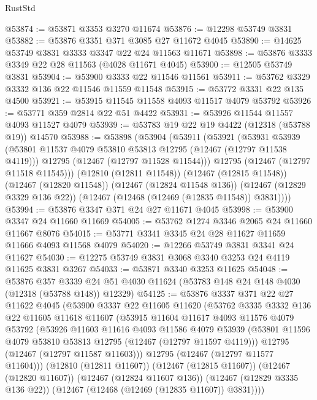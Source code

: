 \begin{lexlean}{RustStd}
\begin{coremodule}
@53874 := @53871 @3353 @3270 @11674
@53876 := @12298 @53749 @3831
@53882 := @53876 @3351 @371 @3085 @27 @11672 @4045
@53890 := @14625 @53749 @3831 @3333 @3347 @22 @24 @11563 @11671
@53898 := @53876 @3333 @3349 @22 @28 @11563 (@4028 @11671 @4045)
@53900 := @12505 @53749 @3831
@53904 := @53900 @3333 @22 @11546 @11561
@53911 := @53762 @3329 @3332 @136 @22 @11546 @11559 @11548
@53915 := @53772 @3331 @22 @135 @4500
@53921 := @53915 @11545 @11558 @4093 @11517 @4079 @53792
@53926 := @53771 @359 @2814 @22 @51 @4422
@53931 := @53926 @11544 @11557 @4093 @11527 @4079
@53939 := @53783 @19 @22 @19 @4422 (@12318 (@53788 @19)) @14570
@53988 := @53898
    (@53904
      (@53911
        (@53921
          (@53931
            @53939
            (@53801 @11537 @4079 @53810 @53813 @12795 (@12467 (@12797 @11538 @4119)))
            @12795
            (@12467 (@12797 @11528 @11544)))
          @12795
          (@12467 (@12797 @11518 @11545)))
        (@12810 (@12811 @11548))
        (@12467 (@12815 @11548))
        (@12467 (@12820 @11548))
        (@12467 (@12824 @11548 @136))
        (@12467 (@12829 @3329 @136 @22))
        (@12467 (@12468 (@12469 (@12835 @11548)) @3831))))
@53994 := @53876 @3347 @371 @24 @27 @11671 @4045
@53998 := @53900 @3347 @24 @11660 @11669
@54005 := @53762 @1274 @3346 @2065 @24 @11660 @11667 @8076
@54015 := @53771 @3341 @3345 @24 @28 @11627 @11659 @11666 @4093 @11568 @4079
@54020 := @12266 @53749 @3831 @3341 @24 @11627
@54030 := @12275 @53749 @3831 @3068 @3340 @3253 @24 @4119 @11625 @3831 @3267
@54033 := @53871 @3340 @3253 @11625
@54048 := @53876
    @357
    @3339
    @24
    @51
    @4030
    @11624
    (@53783 @148 @24 @148 @4030 (@12318 (@53788 @148)) @12329)
@54125 := @53876
    @3337
    @371
    @22
    @27
    @11622
    @4045
    (@53900
      @3337
      @22
      @11605
      @11620
      (@53762
        @3335
        @3332
        @136
        @22
        @11605
        @11618
        @11607
        (@53915
          @11604
          @11617
          @4093
          @11576
          @4079
          @53792
          (@53926
            @11603
            @11616
            @4093
            @11586
            @4079
            @53939
            (@53801 @11596 @4079 @53810 @53813 @12795 (@12467 (@12797 @11597 @4119)))
            @12795
            (@12467 (@12797 @11587 @11603)))
          @12795
          (@12467 (@12797 @11577 @11604)))
        (@12810 (@12811 @11607))
        (@12467 (@12815 @11607))
        (@12467 (@12820 @11607))
        (@12467 (@12824 @11607 @136))
        (@12467 (@12829 @3335 @136 @22))
        (@12467 (@12468 (@12469 (@12835 @11607)) @3831))))

\end{coremodule}
\end{lexlean}
